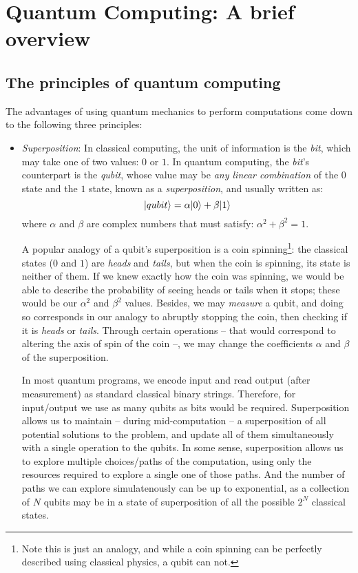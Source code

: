 \chapter{Quantum Computing: A brief overview}
\label{chap:Overview}

\section{The principles of quantum computing}
\label{Principles}

The advantages of using quantum mechanics to perform computations come down to the following three principles:

\begin{itemize}

\item \textit{Superposition}: In classical computing, the unit of information is the \textit{bit}, which may take one of two values: \(0\) or \(1\). In quantum computing, the \textit{bit}'s counterpart is the \textit{qubit}, whose value may be \textit{any linear combination} of the \(0\) state and the \(1\) state, known as a \textit{superposition}, and usually written as: \[\vert qubit \rangle = \alpha\vert 0 \rangle + \beta\vert 1 \rangle\] where \(\alpha\) and \(\beta\) are complex numbers that must satisfy: \(\alpha^2 + \beta^2 = 1\).

A popular analogy of a qubit's superposition is a coin spinning\footnote{Note this is just an analogy, and while a coin spinning can be perfectly described using classical physics, a qubit can not.}: the classical states (\(0\) and \(1\)) are \textit{heads} and \textit{tails}, but when the coin is spinning, its state is neither of them. If we knew exactly how the coin was spinning, we would be able to describe the probability of seeing heads or tails when it stops; these would be our \(\alpha^2\) and \(\beta^2\) values. Besides, we may \textit{measure} a qubit, and doing so corresponds in our analogy to abruptly stopping the coin, then checking if it is \textit{heads} or \textit{tails}. Through certain operations -- that would correspond to altering the axis of spin of the coin --, we may change the coefficients \(\alpha\) and \(\beta\) of the superposition. 

In most quantum programs, we encode input and read output (after measurement) as standard classical binary strings. Therefore, for input/output we use as many qubits as bits would be required. Superposition allows us to maintain -- during mid-computation -- a superposition of all potential solutions to the problem, and update all of them simultaneously with a single operation to the qubits. In some sense, superposition allows us to explore multiple choices/paths of the computation, using only the resources required to explore a single one of those paths. And the number of paths we can explore simulatenously can be up to exponential, as a collection of \(N\) qubits may be in a state of superposition of all the possible \(2^N\) classical states.


\end{itemize}
